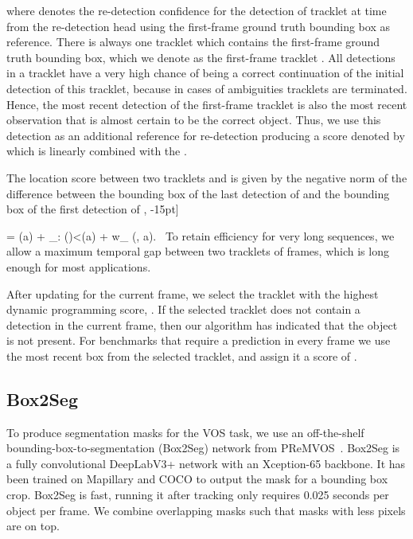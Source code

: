 \documentclass[10pt,twocolumn,letterpaper]{article}
\begin{document}
where  denotes the re-detection confidence for the detection  of tracklet  at time  from the re-detection head using the first-frame ground truth bounding box as reference. There is always one tracklet which contains the first-frame ground truth bounding box, which we denote as the first-frame tracklet . All detections in a tracklet have a very high chance of being a correct continuation of the initial detection of this tracklet, because in cases of ambiguities tracklets are terminated. Hence, the most recent detection of the first-frame tracklet is also the most recent observation that is almost certain to be the correct object. Thus, we use this
 detection
 as an additional reference for re-detection producing a score denoted by  which is linearly combined with the .

The location score between two tracklets  and  is given by the negative  norm of the difference between the bounding box  of the last detection of  and the bounding box of the first detection of , \ie
\vspace{-4pt}
-15pt]\nonumber

  \theta[a] = (a) +\!\!\!\! \max_{: ()<(a)} \!\!\!\theta[\tilde{a}] + w_ (, a). \nonumber
 \
To retain efficiency for very long sequences, we allow a maximum temporal gap between two tracklets of  frames, which is long enough for most applications.

After updating  for the current frame, we select the tracklet  with the highest dynamic programming score, \ie
  .
If the selected tracklet does not contain a detection in the current frame, then our algorithm has indicated that the object is not present. For benchmarks that require a prediction in every frame we use the most recent box from the selected tracklet, and assign it a score of .

\subsection{Box2Seg}
To produce segmentation masks for the VOS task, we use an off-the-shelf bounding-box-to-segmentation (Box2Seg) network from PReMVOS~\cite{Luiten18ACCV}. Box2Seg is a fully convolutional DeepLabV3+ \cite{Chen18ECCV} network with an Xception-65 \cite{CholletCVPR17} backbone. It has been trained on Mapillary \cite{Neuhold17ICCV} and COCO \cite{coco} to output the mask for a bounding box crop. Box2Seg is fast, running it after tracking only requires 0.025 seconds per object per frame.
We combine overlapping masks such that masks with less pixels are on top.
\end{document}
